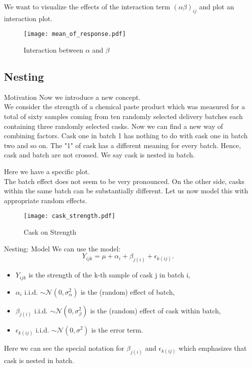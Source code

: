 \documentclass[unknownkeysallowed]{beamer}
\begin{document}
\begin{frame}
	We want to visualize the effects of the interaction term $(\alpha \beta)_{ij}$ and plot an interaction plot.

	\begin{figure}
		\centering
		\texttt{[image: mean\_of\_response.pdf]}
		\caption{Interaction between $\alpha$ and $\beta$}
		\label{fig:my_label}
	\end{figure}
\end{frame}



\subsection{Nesting}
\begin{frame}{Motivation}
	Now we introduce a new concept. \\ We consider the strength of a chemical paste product which was measured for a total of sixty samples coming from ten randomly selected delivery batches each containing three randomly selected casks. Now we can find a new way of combining factors. Cask one in batch 1 has nothing to do with cask one in batch two and so on. The "1" of cask has a different meaning for every batch. Hence, cask and batch are not crossed. We say cask is nested in batch.
	
\end{frame}

\begin{frame}
	Here we have a specific plot. \\ The batch effect does not seem to be very pronounced. On the other side, casks within the same batch can be substantially different. Let us now model this with appropriate random effects.
	
	\begin{figure}
		\centering
		\texttt{[image: cask\_strength.pdf]}
		\caption{Cask on Strength}
		\label{fig:my_label}
	\end{figure}

	
\end{frame}

\begin{frame}{Nesting: Model}
	We can use the model:
	\begin{equation*}
		Y_{ijk} = \mu + \alpha_i + \beta_{j(i)} + \epsilon_{k(ij)}.
	\end{equation*}
	\begin{itemize}
		\item $Y_{ijk}$ is the strength of the k-th sample of cask j in batch i,
		\item $\alpha_i$ i.i.d.  
		$\sim \mathcal{N}(0,\sigma^2_{\alpha})$ is the (random) effect of batch,
		\item $\beta_{j(i)}$ i.i.d.  
		$\sim \mathcal{N}(0,\sigma^2_{\beta})$ is the (random) effect of cask within batch,
		\item $\epsilon_{k(ij)}$ i.i.d.  
		$\sim \mathcal{N}(0,\sigma^2)$ is the error term.
	\end{itemize}
	Here we can see the special notation for $\beta_{j(i)}$ and $\epsilon_{k(ij)}$ which emphasizes that cask is nested in batch.
\end{frame}
\end{document}
